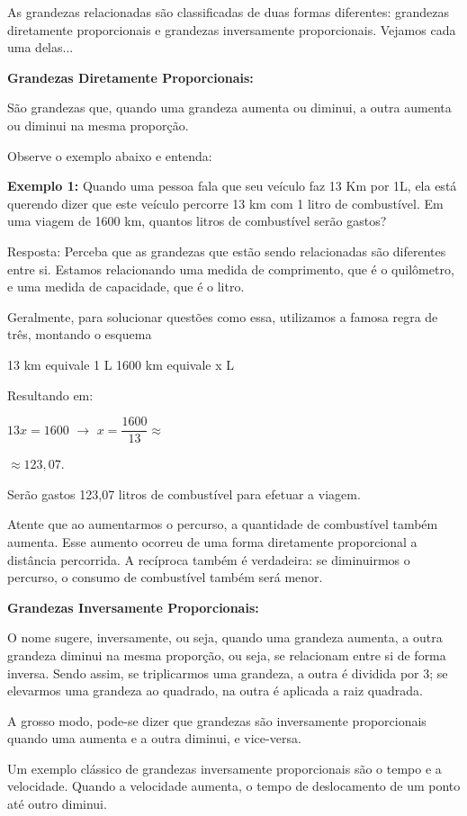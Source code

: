 \begin{multicols*}{2}
	As grandezas relacionadas são classificadas de duas formas diferentes: grandezas diretamente proporcionais  e grandezas inversamente proporcionais. Vejamos cada uma delas...

	\textbf{Grandezas Diretamente Proporcionais:}

	São grandezas que, quando uma grandeza aumenta ou diminui, a outra aumenta ou diminui na mesma proporção.

	Observe o exemplo abaixo e entenda:

	\textbf{Exemplo 1:} Quando uma pessoa fala que seu veículo faz 13 Km por 1L, ela está querendo dizer que este veículo percorre 13 km com 1 litro de combustível. Em uma viagem de 1600 km, quantos litros de combustível serão gastos?

	Resposta: Perceba que as grandezas que estão sendo relacionadas são diferentes entre si. Estamos relacionando uma medida de comprimento, que é o quilômetro, e uma medida de capacidade, que é o litro.

	Geralmente, para solucionar questões como essa, utilizamos a famosa regra de três, montando o esquema

	13 km   equivale 1 L
	1600 km equivale x L

	Resultando em:

	{$ 13x = 1600 \, \, \to \, \, x = \dfrac{1600}{13} \approx $}

	{$ \approx 123,07 $}.

	Serão gastos 123,07 litros de combustível para efetuar a viagem.

	Atente que ao aumentarmos o percurso, a quantidade de combustível também aumenta. Esse aumento ocorreu de uma forma diretamente proporcional a distância percorrida. A recíproca também é verdadeira: se diminuirmos o percurso, o consumo de combustível também será menor.

	\textbf{Grandezas Inversamente Proporcionais:}

	O nome sugere, inversamente, ou seja, quando uma grandeza aumenta, a outra grandeza diminui na mesma proporção, ou seja, se relacionam entre si de forma inversa. Sendo assim, se triplicarmos uma grandeza, a outra é dividida por 3; se elevarmos uma grandeza ao quadrado, na outra é aplicada a raiz quadrada.

	A grosso modo, pode-se dizer que grandezas são inversamente proporcionais quando uma aumenta e a outra diminui, e vice-versa.

	Um exemplo clássico de grandezas inversamente proporcionais são o tempo e a velocidade. Quando a velocidade aumenta, o tempo de deslocamento de um ponto até outro diminui.


\end{multicols*}
